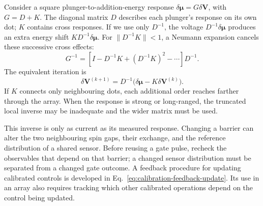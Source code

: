 Consider a square plunger-to-addition-energy response
\(\delta\boldsymbol\mu=G\delta\mathbf V\), with
\(G=D+K\). The diagonal matrix \(D\) describes each
plunger's response on its own dot; \(K\) contains cross
responses. If we use only \(D^{-1}\), the voltage
\(D^{-1}\delta\boldsymbol\mu\) produces an extra energy
shift \(KD^{-1}\delta\boldsymbol\mu\). For
\(\|D^{-1}K\|<1\), a Neumann expansion cancels these
successive cross effects:
\begin{equation}
 G^{-1}
 =[I-D^{-1}K+(D^{-1}K)^2-\cdots]D^{-1}.
 \label{eq:processor-local-compensation}
\end{equation}
The equivalent iteration is
\[
 \delta\mathbf V^{(k+1)}
 =D^{-1}\bigl(\delta\boldsymbol\mu-K\delta\mathbf V^{(k)}\bigr).
\]
If \(K\) connects only neighbouring dots, each additional
order reaches farther through the array. When the response is
strong or long-ranged, the truncated local inverse may be
inadequate and the wider matrix must be used.

This inverse is only as current as its measured response.
Changing a barrier can alter the two neighbouring spin gaps,
their exchange, and the reference distribution of a shared
sensor. Before reusing a gate pulse, recheck the observables
that depend on that barrier; a changed sensor distribution
must be separated from a changed gate outcome. A feedback
procedure for updating calibrated controls is developed in
Eq.~\eqref{eq:calibration-feedback-update}. Its use in an array
also requires tracking which other calibrated operations depend
on the control being updated.
